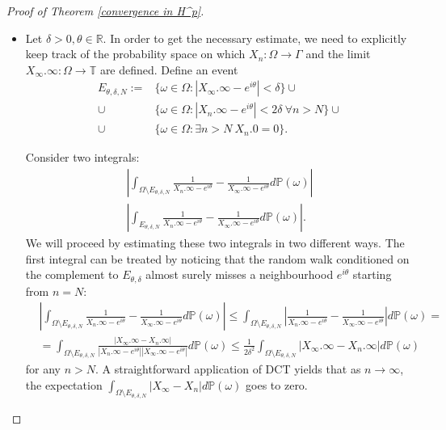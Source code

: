 \documentclass[11pt]{article}
\begin{document}
\begin{proof}[Proof of Theorem \ref{convergence in H^p}]
	\indent
	\begin{itemize}
		\item 
		
		Let $\delta > 0, \theta \in \mathbb{R}$. In order to get the necessary estimate, we need to explicitly keep track of the probability space on which $X_n : \Omega \rightarrow \Gamma$ and the limit $X_\infty.\infty: \Omega \rightarrow \mathbb{T}$ are defined. Define an event 
		\[
		\begin{aligned}
			E_{\theta, \delta, N}  := & \{ \omega \in \Omega : |X_\infty.\infty - e^{i \theta}| < \delta \} \cup \\  \cup & \{\omega \in \Omega : | X_n.\infty - e^{i \theta}| < 2 \delta \  \forall n > N\} \cup \\ \cup & \{\omega \in \Omega : \exists n > N \  X_n.0 = 0 \}.
		\end{aligned}		
		\]
		
		Consider two integrals:
		\begin{gather}
			\left| \int_{\Omega \setminus E_{\theta, \delta, N}} \frac{1}{X_n.\infty - e^{i \theta}} - \frac{1}{X_\infty.\infty - e^{i \theta}} d \mathbb{P}(\omega) \right| \\
			\left| \int_{E_{\theta, \delta, N}} \frac{1}{X_n.\infty - e^{i \theta}} - \frac{1}{X_\infty.\infty - e^{i \theta}} d \mathbb{P}(\omega) \right|.
		\end{gather}
		We will proceed by estimating these two integrals in two different ways. The first integral can be treated by noticing that the random walk conditioned on the complement to $E_{\theta, \delta}$ almost surely misses a neighbourhood $e^{i \theta}$ starting from $n = N$:
		\[
		\begin{aligned}
			& \left| \int_{\Omega \setminus E_{\theta, \delta, N}} \frac{1}{X_n.\infty - e^{i \theta}} - \frac{1}{X_\infty.\infty - e^{i \theta}} d \mathbb{P}(\omega) \right| \le
			\int_{\Omega \setminus E_{\theta, \delta, N}} \left| \frac{1}{X_n.\infty - e^{i \theta}} - \frac{1}{X_\infty.\infty - e^{i \theta}} \right| d \mathbb{P}(\omega) = \\ 
			& = \int_{\Omega \setminus E_{\theta, \delta, N}} \frac{|X_\infty.\infty - X_n.\infty|}{|X_n.\infty - e^{i \theta}| |X_\infty.\infty - e^{i \theta}|} d \mathbb{P}(\omega) \le \frac{1}{2 \delta^2} \int_{\Omega \setminus E_{\theta, \delta, N}} |X_\infty.\infty - X_n.\infty| d \mathbb{P}(\omega)
		\end{aligned}
		\]
		for any $n > N$. A straightforward application of DCT yields that as $n \rightarrow \infty$, the expectation $\int_{\Omega \setminus E_{\theta, \delta, N}} |X_\infty - X_n| d \mathbb{P}(\omega)$ goes to zero.
		

\end{itemize}
\end{proof}
\end{document}
